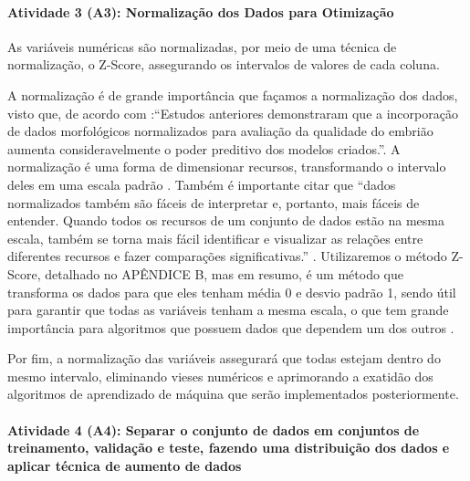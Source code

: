 \paragraph{\textbf{Atividade 3 (A3):} Normalização dos Dados para Otimização}

As variáveis numéricas são normalizadas, por meio de uma técnica de normalização, o Z-Score, assegurando os intervalos de valores de cada coluna. 

A normalização é de grande importância que façamos a normalização dos dados, visto que, de acordo com :“Estudos anteriores demonstraram que a incorporação de dados morfológicos normalizados para avaliação da qualidade do embrião aumenta consideravelmente o poder preditivo dos modelos criados.”. A normalização é uma forma de dimensionar recursos, transformando o intervalo deles em uma escala padrão \cite{jaiswal2024}. Também é importante citar que “dados normalizados também são fáceis de interpretar e, portanto, mais fáceis de entender. Quando todos os recursos de um conjunto de dados estão na mesma escala, também se torna mais fácil identificar e visualizar as relações entre diferentes recursos e fazer comparações significativas.” \cite{jaiswal2024}. Utilizaremos o método Z-Score, detalhado no APÊNDICE B, mas em resumo, é um método que transforma os dados para que eles tenham média 0 e desvio padrão 1, sendo útil para garantir que todas as variáveis tenham a mesma escala, o que tem grande importância para algoritmos que possuem dados que dependem um dos outros \cite{jaiswal2024}.

Por fim, a normalização das variáveis assegurará que todas estejam dentro do mesmo intervalo, eliminando vieses numéricos e aprimorando a exatidão dos algoritmos de aprendizado de máquina que serão implementados posteriormente.

\paragraph{\textbf{Atividade 4 (A4):} Separar o conjunto de dados em conjuntos de treinamento, validação e teste, fazendo uma distribuição dos dados e aplicar técnica de aumento de dados}
   
